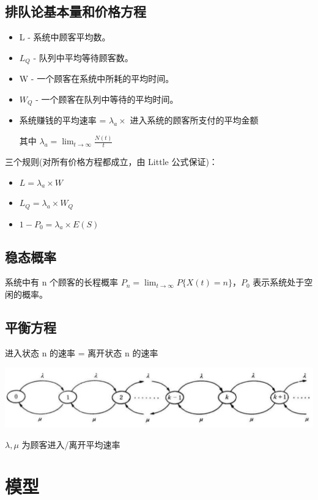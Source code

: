 \documentclass[12pt,a4paper]{article}
\begin{document}
\subsection{排队论基本量和价格方程}
\begin{itemize}
  \item L - 系统中顾客平均数。
  \item $L_Q$ - 队列中平均等待顾客数。
  \item W - 一个顾客在系统中所耗的平均时间。
  \item $W_Q$ - 一个顾客在队列中等待的平均时间。
  \item 系统赚钱的平均速率 = $\lambda_a\times$ 进入系统的顾客所支付的平均金额

  其中 $\lambda_a = \lim_{t\to \infty}\frac{N(t)}{t}$
\end{itemize}
三个规则(对所有价格方程都成立，由 Little 公式保证)：
\begin{itemize}
  \item $L = \lambda_a\times W$
  \item $L_Q = \lambda_a\times W_Q$
  \item $1 - P_0 = \lambda_a\times E(S)$
\end{itemize}
\subsection{稳态概率}
系统中有 n 个顾客的长程概率 $P_n = \lim_{t\to \infty}P\{X(t) = n\}$，$P_0$ 表示系统处于空闲的概率。
\subsection{平衡方程}
进入状态 n 的速率 = 离开状态 n 的速率
\begin{center}
  \includegraphics[width  = \textwidth]{figures/stable_equation}
\end{center}
$\lambda,\mu$ 为顾客进入/离开平均速率

\section{模型}
\end{document}
